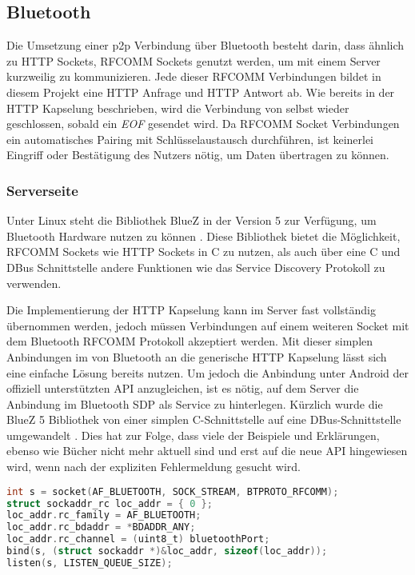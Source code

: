         \subsection{Bluetooth}
        Die Umsetzung einer p2p Verbindung über Bluetooth besteht darin, dass ähnlich zu HTTP Sockets, RFCOMM Sockets genutzt werden, um mit einem Server kurzweilig zu kommunizieren. Jede dieser RFCOMM Verbindungen bildet in diesem Projekt eine HTTP Anfrage und HTTP Antwort ab. Wie bereits in der HTTP Kapselung beschrieben, wird die Verbindung von selbst wieder geschlossen, sobald ein {\it EOF} gesendet wird. Da RFCOMM Socket Verbindungen ein automatisches Pairing mit Schlüsselaustausch durchführen, ist keinerlei Eingriff oder Bestätigung des Nutzers nötig, um Daten übertragen zu können.
        
        \subsubsection{Serverseite}        
        Unter Linux steht die Bibliothek BlueZ in der Version 5 zur Verfügung, um Bluetooth Hardware nutzen zu können \cite{bluezMigration}. Diese Bibliothek bietet die Möglichkeit, RFCOMM Sockets wie HTTP Sockets in C zu nutzen, als auch über eine C und DBus Schnittstelle andere Funktionen wie das Service Discovery Protokoll zu verwenden.
        
        Die Implementierung der HTTP Kapselung kann im Server fast vollständig übernommen werden, jedoch müssen Verbindungen auf einem weiteren Socket mit dem Bluetooth RFCOMM Protokoll akzeptiert werden. Mit dieser simplen Anbindungen im  von Bluetooth an die generische HTTP Kapselung lässt sich eine einfache Lösung bereits nutzen. Um jedoch die Anbindung unter Android der offiziell unterstützten API anzugleichen, ist es nötig, auf dem Server die Anbindung im Bluetooth SDP als Service zu hinterlegen. Kürzlich wurde die BlueZ 5 Bibliothek von einer simplen C-Schnittstelle auf eine DBus-Schnittstelle umgewandelt \cite{bluezMigration}. Dies hat zur Folge, dass viele der Beispiele und Erklärungen, ebenso wie Bücher nicht mehr aktuell sind und erst auf die neue API hingewiesen wird, wenn nach der expliziten Fehlermeldung gesucht wird.

        \begin{lstlisting}[frame=bt, label={lst:bluetooth:socket}, language=C, caption=Verbindungsaufbau mit Bluetooth (Servercode in C)]
int s = socket(AF_BLUETOOTH, SOCK_STREAM, BTPROTO_RFCOMM);
struct sockaddr_rc loc_addr = { 0 };
loc_addr.rc_family = AF_BLUETOOTH;
loc_addr.rc_bdaddr = *BDADDR_ANY;
loc_addr.rc_channel = (uint8_t) bluetoothPort;
bind(s, (struct sockaddr *)&loc_addr, sizeof(loc_addr));
listen(s, LISTEN_QUEUE_SIZE);
        \end{lstlisting}        
        
